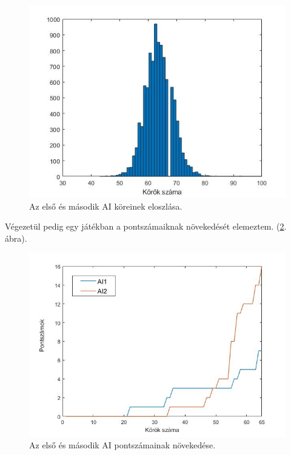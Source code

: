 \begin{figure}[h]
\centering
\includegraphics[scale=0.5]{images/round_number_hist_AI1vsAI2.jpg}
\caption{Az első és második AI köreinek eloszlása.}
\label{fig:rounds1v2}
\end{figure}

Végezetül pedig egy játékban a pontszámaiknak növekedését elemeztem. (\ref{fig:player_scores1v2}. ábra).

\begin{figure}[h]
\centering
\includegraphics[scale=0.5]{images/player_points_AI1vsAI2.jpg}
\caption{Az első és második AI pontszámainak növekedése.}
\label{fig:player_scores1v2}
\end{figure}


